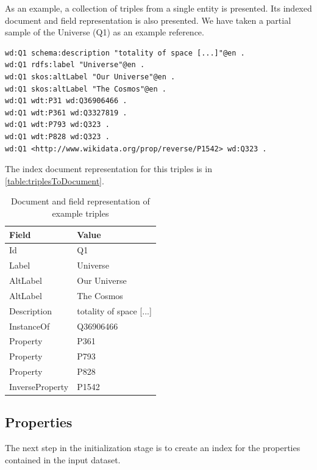 \begin{example}
As an example, a collection of triples from a single entity is presented. Its indexed document and field representation is also presented. We have taken a partial sample of the Universe (Q1) as an example reference.

\begin{verbatim}
wd:Q1 schema:description "totality of space [...]"@en .
wd:Q1 rdfs:label "Universe"@en .
wd:Q1 skos:altLabel "Our Universe"@en .
wd:Q1 skos:altLabel "The Cosmos"@en .
wd:Q1 wdt:P31 wd:Q36906466 .
wd:Q1 wdt:P361 wd:Q3327819 .
wd:Q1 wdt:P793 wd:Q323 .
wd:Q1 wdt:P828 wd:Q323 .
wd:Q1 <http://www.wikidata.org/prop/reverse/P1542> wd:Q323 .
\end{verbatim}

The index document representation for this triples is in \autoref{table:triplesToDocument}.

\begin{table}[h!]
\centering
\begin{tabular}{ll}
Field           & Value                    \\ 
\hline
Id              & Q1                       \\
Label           & Universe                 \\
AltLabel        & Our Universe             \\
AltLabel        & The Cosmos               \\
Description     & totality of space [...]  \\
InstanceOf      & Q36906466                \\
Property        & P361                     \\
Property        & P793                     \\
Property        & P828                     \\
InverseProperty & P1542                   
\end{tabular}
\caption{Document and field representation of example triples}
\label{table:triplesToDocument}

\end{table}

\end{example}

\subsection{Properties}
The next step in the initialization stage is to create an index for the properties contained in the input dataset.

